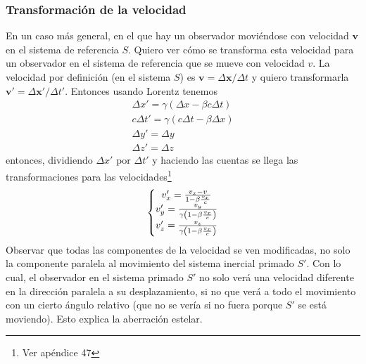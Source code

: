 \subsubsection{Transformación de la velocidad}
En un caso más general, en el que hay un observador moviéndose con velocidad $\textbf{v}$ en el sistema de referencia $S$. Quiero ver cómo se transforma esta velocidad para un observador en el sistema de referencia que se mueve con velocidad $v$. La velocidad por definición (en el sistema $S$) es $\textbf{v} = \Delta \textbf{x}/\Delta t$ y quiero transformarla $\textbf{v}' = \Delta \textbf{x}'/\Delta t'$. Entonces usando Lorentz tenemos
\begin{equation*}
    \begin{matrix}
        \Delta x' = \gamma(\Delta x - \beta c \Delta t)\\
        c\Delta t' = \gamma(c\Delta t - \beta \Delta x)\\
        \Delta y' = \Delta y\\
        \Delta z' = \Delta z
    \end{matrix}
\end{equation*}
entonces, dividiendo $\Delta x'$ por $\Delta t'$ y haciendo las cuentas se llega las transformaciones para las velocidades\footnote{Ver apéndice 47}
\begin{equation*}
    \left\{
        \begin{matrix}
            v'_{x} = \frac{v_{x} - v}{1 - \beta \frac{v_{x}}{c}}\\
            v'_{y} = 
            \frac%
            {%
                v_{y}
            }%
            {%
                \gamma
                \left(
                    1 - \beta \frac{v_{x}}{c}
                \right)
            }\\
            v'_{z} = 
            \frac%
            {%
                v_{z}
            }%
            {%
                \gamma
                \left(
                    1 - \beta \frac{v_{x}}{c}
                \right)
            }
        \end{matrix}
    \right.
\end{equation*}
Observar que todas las componentes de la velocidad se ven modificadas, no solo la componente paralela al movimiento del sistema inercial primado $S'$. Con lo cual, el observador en el sistema primado $S'$ no solo verá una velocidad diferente en la dirección paralela a su desplazamiento, si no que verá a todo el movimiento con un cierto ángulo relativo (que no se vería si no fuera porque $S'$ se está moviendo). Esto explica la aberración estelar.


